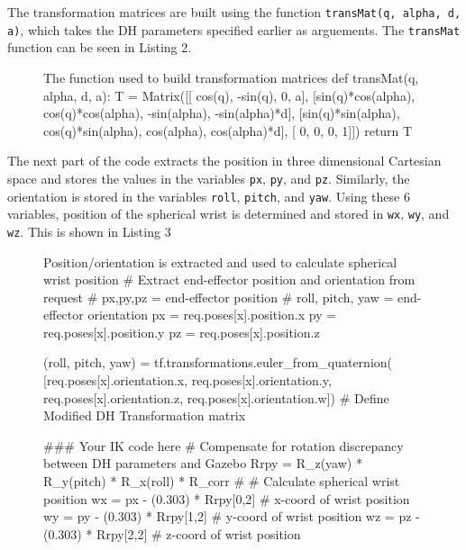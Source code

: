 \documentclass[a4paper]{article}
\begin{document}
The transformation matrices are built using the function \verb|transMat(q, alpha, d, a)|, which takes the DH parameters specified earlier as arguements. The \verb|transMat| function can be seen in Listing 2.

\begin{figure}[h]\footnotesize
	\begin{sexylisting}{The function used to build transformation matrices}
def transMat(q, alpha, d, a):
   T = Matrix([[           cos(q),           -sin(q),           0,             a],
               [sin(q)*cos(alpha), cos(q)*cos(alpha), -sin(alpha), -sin(alpha)*d],
               [sin(q)*sin(alpha), cos(q)*sin(alpha),  cos(alpha),  cos(alpha)*d],
               [                 0,                0,           0,             1]])
   return T	
	\end{sexylisting}
\end{figure}

The next part of the code extracts the position in three dimensional Cartesian space and stores the values in the variables \verb|px|, \verb|py|, and \verb|pz|. Similarly, the orientation is stored in the variables \verb|roll|, \verb|pitch|, and \verb|yaw|. Using these 6 variables, position of the spherical wrist is determined and stored in \verb|wx|, \verb|wy|, and \verb|wz|. This is shown in Listing 3

\begin{figure}[h]\footnotesize
	\begin{sexylisting}{Position/orientation is extracted and used to calculate spherical wrist position}
# Extract end-effector position and orientation from request
# px,py,pz = end-effector position
# roll, pitch, yaw = end-effector orientation
px = req.poses[x].position.x
py = req.poses[x].position.y
pz = req.poses[x].position.z

(roll, pitch, yaw) = tf.transformations.euler_from_quaternion(
[req.poses[x].orientation.x, req.poses[x].orientation.y,
req.poses[x].orientation.z, req.poses[x].orientation.w])
# Define Modified DH Transformation matrix

### Your IK code here
# Compensate for rotation discrepancy between DH parameters and Gazebo
Rrpy = R_z(yaw) * R_y(pitch) * R_x(roll) * R_corr
#
# Calculate spherical wrist position
wx = px - (0.303) * Rrpy[0,2] # x-coord of wrist position
wy = py - (0.303) * Rrpy[1,2] # y-coord of wrist position
wz = pz - (0.303) * Rrpy[2,2] # z-coord of wrist position
	\end{sexylisting}
\end{figure}
\end{document}
